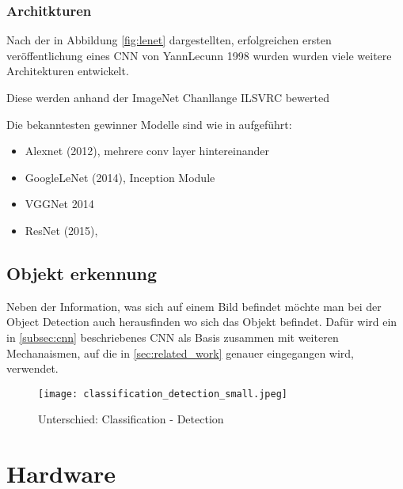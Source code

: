 \subsubsection{Architkturen}\label{subsubsec:architecture}

Nach der in Abbildung \ref{fig:lenet} dargestellten, erfolgreichen
ersten veröffentlichung eines CNN von YannLecunn 1998 \cite{lecunGradientBasedLearningApplied1998}
wurden wurden viele weitere Architekturen entwickelt. 

Diese werden anhand der ImageNet Chanllange ILSVRC \cite{ILSVRC15} bewerted

Die bekanntesten gewinner Modelle sind wie in \cite{StanfordCS231nConvolutional}
aufgeführt:


\begin{itemize}
    \item Alexnet (2012), mehrere conv layer hintereinander
    \item GoogleLeNet (2014), Inception Module
    \item VGGNet 2014
    \item ResNet (2015), 
\end{itemize}

\subsection{Objekt erkennung}\label{subsec:objdet_det}

Neben der Information, was sich auf einem Bild befindet möchte
man bei der Object Detection auch herausfinden wo sich das 
Objekt befindet.
Dafür wird ein in \ref{subsec:cnn} beschriebenes CNN als Basis 
zusammen mit weiteren Mechanaismen, auf die in \ref{sec:related_work}
genauer eingegangen wird, verwendet.
\begin{figure}[htb]
    \centering
    \label{fig:class_vs_det}
    \texttt{[image: classification\_detection\_small.jpeg]}
    \caption{Unterschied: Classification - Detection}
\end{figure}


\section{Hardware}\label{sec:hardware}

